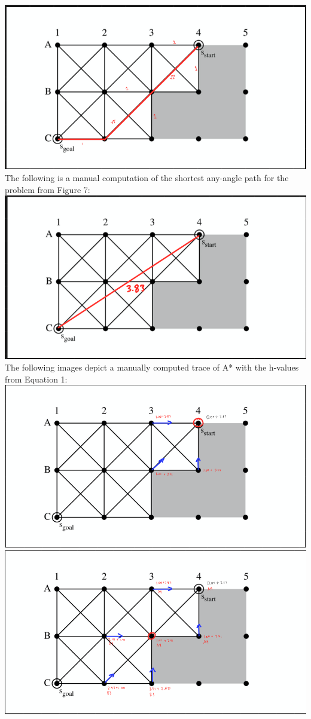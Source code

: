 \documentclass[12pt]{article}
\begin{document}
{\includegraphics{s_grid_man.png}
\\
The following is a manual computation of the shortest any-angle path for the problem from Figure 7:
\\
\includegraphics{s_any_man.png}
\\
The following images depict a manually computed trace of A* with the h-values from Equation 1:
\\
\includegraphics{s_grid_a_1.png}
\\
\includegraphics{s_grid_a_2.png}
}
\end{document}

